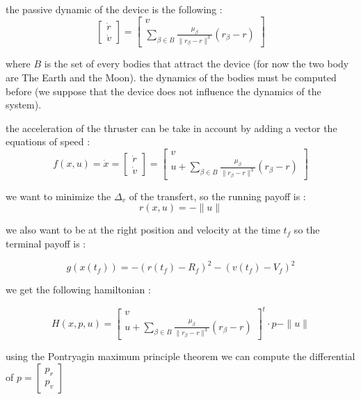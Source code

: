 \documentclass{article} %
\begin{document}
{			the passive dynamic of the device is the following : 
			$$
			\begin{bmatrix}
				\dot{r}\\
				\dot{v}
			\end{bmatrix} =\begin{bmatrix}
				v\\
				\sum\limits _{\beta \in B }\frac{\mu _{\beta }}{\| r_{\beta } -r\| ^{3}}( r_{\beta } -r)
			\end{bmatrix}
			$$
			
			where $B$ is the set of every bodies that attract the device (for now the two body are The Earth and the Moon). the dynamics of the bodies must be computed before (we suppose that the device does not influence the dynamics of the system).
			
			the acceleration of the thruster can be take in account by adding a vector the equations of speed : \\
			
			$$
			f(x,u)=\dot{x}=
			\begin{bmatrix}
				\dot{r}\\
				\dot{v}
			\end{bmatrix}
			=\begin{bmatrix}
				v\\
				u+\sum\limits _{\beta \in B }\frac{\mu _{\beta }}{\| r_{\beta } -r\| ^{3}}( r_{\beta } -r)
			\end{bmatrix}
			$$
			
			we want to minimize the $\Delta_v$ of the transfert, so the running payoff is :
			$$
			r(x,u)=-\|u\|
			$$ 
			
			we also want to be at the right position and velocity at the time $t_f$ so the terminal payoff is :
			
			$$
			g(x(t_f))=-(r(t_f)-R_f)^2-(v(t_f)-V_f)^2
			$$
			
			we get the following hamiltonian :
			
			$$
			H(x,p,u)=\begin{bmatrix}
				v\\
				u+\sum\limits _{\beta \in B }\frac{\mu _{\beta }}{\| r_{\beta } -r\| ^{3}}( r_{\beta } -r)
			\end{bmatrix}^t\cdot p-\|u\|
			$$
			
			using the Pontryagin maximum principle theorem we can compute the differential of $p=\begin{bmatrix}p_r\\p_v\end{bmatrix}$
			
}
\end{document}
